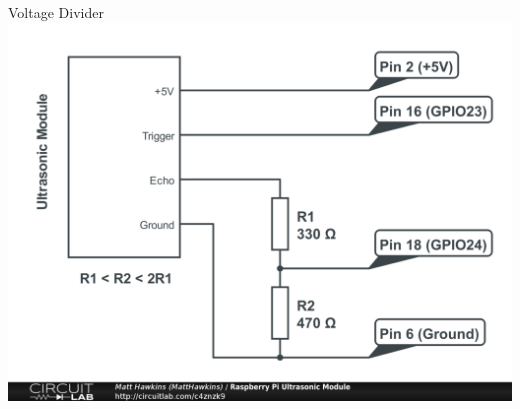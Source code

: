\documentclass[12pt,letterpaper]{beamer}
\begin{document}
\begin{frame}{Voltage Divider}
    \includegraphics[width=.95\linewidth]{voltage_divider}
\end{frame}
\end{document}
